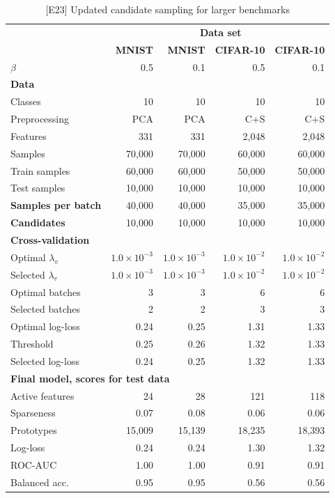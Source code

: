 %
\begin{table}
\caption{[E23] Updated candidate sampling for larger benchmarks}
\label{tab_e23}
%
\begin{center}
\small
\begin{tabular}{|lrrrr|}
\hline
&\multicolumn{4}{c|}{\textbf{\hrulefill\ Data set \hrulefill}}\\
&\textbf{MNIST}&\textbf{MNIST}&\textbf{CIFAR-10}&\textbf{CIFAR-10}\\
\textbf{$\beta$}&0.5&0.1&0.5&0.1\\
\multicolumn{5}{|l|}{\textbf{Data}}\\
Classes&10&10&10&10\\
Preprocessing&PCA&PCA&C+S&C+S\\
Features&331&331&2,048&2,048\\
Samples&70,000&70,000&60,000&60,000\\
Train samples&60,000&60,000&50,000&50,000\\
Test samples&10,000&10,000&10,000&10,000\\
\textbf{Samples per batch}&40,000&40,000&35,000&35,000\\
\textbf{Candidates}&10,000&10,000&10,000&10,000\\
\multicolumn{5}{|l|}{\textbf{Cross-validation}}\\
Optimal $\lambda_v$&$1.0\times10^{-3}$&$1.0\times10^{-3}$&$1.0\times10^{-2}$&$1.0\times10^{-2}$\\
Selected $\lambda_v$&$1.0\times10^{-3}$&$1.0\times10^{-3}$&$1.0\times10^{-2}$&$1.0\times10^{-2}$\\
Optimal batches&3&3&6&6\\
Selected batches&2&2&3&3\\
Optimal log-loss&0.24&0.25&1.31&1.33\\
Threshold&0.25&0.26&1.32&1.33\\
Selected log-loss&0.24&0.25&1.32&1.33\\
\multicolumn{5}{|l|}{\textbf{Final model, scores for test data}}\\
Active features&24&28&121&118\\
Sparseness&0.07&0.08&0.06&0.06\\
Prototypes&15,009&15,139&18,235&18,393\\
Log-loss&0.24&0.24&1.30&1.32\\
ROC-AUC&1.00&1.00&0.91&0.91\\
Balanced acc.&0.95&0.95&0.56&0.56\\
\hline
\end{tabular}
\end{center}
\end{table}
